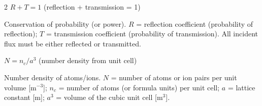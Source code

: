 \documentclass[9pt]{extarticle}
\newcommand{\desc}[1]{{\small\color{desc}#1}}
\begin{document}
\begin{multicols}{2}
$R + T = 1$ (reflection + transmission = 1)

\desc{Conservation of probability (or power). $R$ = reflection coefficient (probability of reflection); $T$ = transmission coefficient (probability of transmission). All incident flux must be either reflected or transmitted.}

$N = n_c/a^3$ (number density from unit cell)

\desc{Number density of atoms/ions. $N$ = number of atoms or ion pairs per unit volume [m$^{-3}$]; $n_c$ = number of atoms (or formula units) per unit cell; $a$ = lattice constant [m]; $a^3$ = volume of the cubic unit cell [m$^3$].}

\end{multicols}
\end{document}
